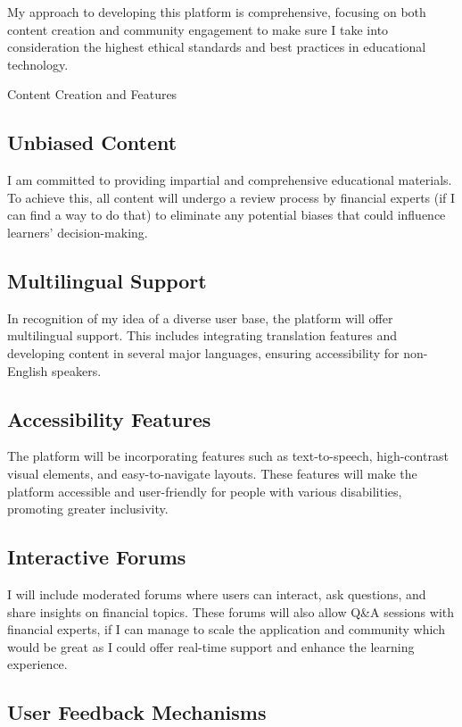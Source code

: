 \documentclass[12pt,twocolumn]{article}
\begin{document}
My approach to developing this platform is comprehensive, focusing on both content creation and community engagement to make sure I take into consideration the highest ethical standards and best practices in educational technology.

Content Creation and Features
\subsection{Unbiased Content}

I am committed to providing impartial and comprehensive educational materials. To achieve this, all content will undergo a review process by financial experts (if I can find a way to do that) to eliminate any potential biases that could influence learners' decision-making.

\subsection{Multilingual Support}

In recognition of my idea of a diverse user base, the platform will offer multilingual support. This includes integrating translation features and developing content in several major languages, ensuring accessibility for non-English speakers.

\subsection{Accessibility Features}

The platform will be incorporating features such as text-to-speech, high-contrast visual elements, and easy-to-navigate layouts. These features will make the platform accessible and user-friendly for people with various disabilities, promoting greater inclusivity.

\subsection{Interactive Forums}

I will include moderated forums where users can interact, ask questions, and share insights on financial topics. These forums will also allow Q&A sessions with financial experts, if I can manage to scale the application and community which would be great as I could offer real-time support and enhance the learning experience.

\subsection{User Feedback Mechanisms}
\end{document}
